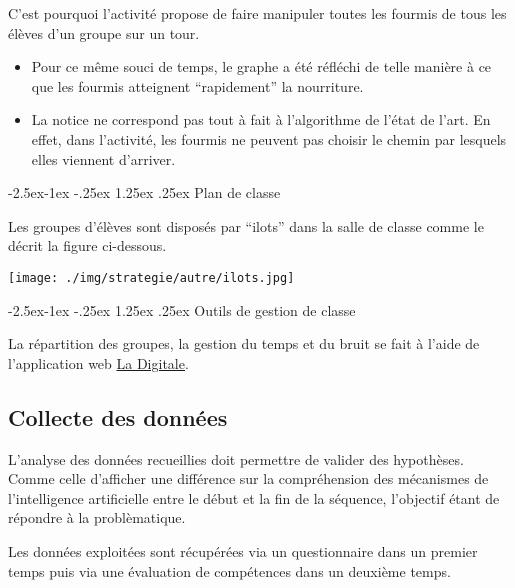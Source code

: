 \documentclass[
12pt,
french,
]{article}
\makeatletter
\let\origfigure\figure
\let\endorigfigure\endfigure
\renewenvironment{figure}[1][2] {
  \expandafter\origfigure\expandafter[H]
} {
  \endorigfigure
}
\renewcommand\paragraph{\@startsection{paragraph}{4}{\z@}%
        {-2.5ex\@plus -1ex \@minus -.25ex}%
        {1.25ex \@plus .25ex}%
        {\normalfont\normalsize\bfseries}}
\makeatother
\begin{document}
C'est pourquoi l'activité propose de faire manipuler toutes les fourmis
de tous les élèves d'un groupe sur un tour.

\begin{itemize}
\item
  Pour ce même souci de temps, le graphe a été réfléchi de telle manière
  à ce que les fourmis atteignent ``rapidement'' la nourriture.
\item
  La notice ne correspond pas tout à fait à l'algorithme de l'état de
  l'art. En effet, dans l'activité, les fourmis ne peuvent pas choisir
  le chemin par lesquels elles viennent d'arriver.
\end{itemize}

\hypertarget{plan-de-classe}{%
\paragraph{Plan de classe}\label{plan-de-classe}}

Les groupes d'élèves sont disposés par ``ilots'' dans la salle de classe
comme le décrit la figure ci-dessous.

\begin{figure}
\centering
\texttt{[image: ./img/strategie/autre/ilots.jpg]}
\caption{Photo de classe formée en îlots}
\end{figure}

\hypertarget{outils-de-gestion-de-classe}{%
\paragraph{Outils de gestion de
classe}\label{outils-de-gestion-de-classe}}

La répartition des groupes, la gestion du temps et du bruit se fait à
l'aide de l'application web \href{https://ladigitale.dev/digiscreen/}{La
Digitale}.

\hypertarget{collecte-des-donnuxe9es}{%
\subsection{Collecte des données}\label{collecte-des-donnuxe9es}}

L'analyse des données recueillies doit permettre de valider des
hypothèses. Comme celle d'afficher une différence sur la compréhension
des mécanismes de l'intelligence artificielle entre le début et la fin
de la séquence, l'objectif étant de répondre à la problèmatique.

Les données exploitées sont récupérées via un questionnaire dans un
premier temps puis via une évaluation de compétences dans un deuxième
temps.
\end{document}
